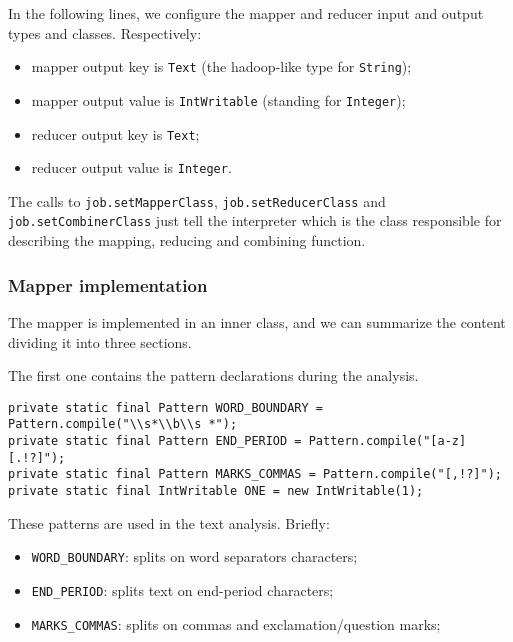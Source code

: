 \documentclass[a4paper,11pt, twoside]{article}
\begin{document}
		\bigskip
		\noindent
		In the following lines, we configure the mapper and reducer input and output types and classes.
		Respectively: \begin{itemize}
			\item mapper output key is \lstinline|Text| (the hadoop-like type for \lstinline|String|);
			\item mapper output value is \lstinline|IntWritable| (standing for \lstinline|Integer|);
			\item reducer output key is \lstinline|Text|;
			\item reducer output value is \lstinline|Integer|.
		\end{itemize}

		\noindent
		The calls to \lstinline|job.setMapperClass|, \lstinline|job.setReducerClass| and \lstinline|job.setCombinerClass| just tell the interpreter which is the class responsible for describing the mapping, reducing and combining function.
		
	\subsubsection{Mapper implementation} 
		
		The mapper is implemented in an inner class, and we can summarize the content dividing it into three sections.

		\noindent
		The first one contains the pattern declarations during the analysis.
	
	\begin{lstlisting}[firstnumber=73, caption={Declaration of Regular Expression Patterns}, captionpos=b]
private static final Pattern WORD_BOUNDARY = Pattern.compile("\\s*\\b\\s *");
private static final Pattern END_PERIOD = Pattern.compile("[a-z][.!?]");
private static final Pattern MARKS_COMMAS = Pattern.compile("[,!?]");
private static final IntWritable ONE = new IntWritable(1);
	\end{lstlisting}
	
		\noindent
		These patterns are used in the text analysis. Briefly: 
		\begin{itemize}
			\item \lstinline|WORD_BOUNDARY|: splits on word separators characters;
			\item \lstinline|END_PERIOD|: splits text on end-period characters;
			\item \lstinline|MARKS_COMMAS|: splits on commas and exclamation/question marks;
		\end{itemize}
\end{document}
